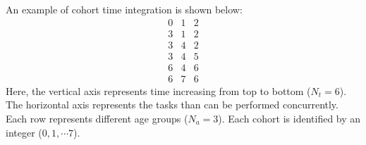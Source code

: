 \documentclass[a4paper,oneside,12pt]{article}
\begin{document}
An example of cohort time integration is shown below:
\begin{equation} \label{eq:cohorts}
\begin{array}{ccc}
0 & 1 & 2 \\
3 & 1 & 2 \\
3 & 4 & 2 \\
3 & 4 & 5 \\
6 & 4 & 6 \\
6 & 7 & 6
\end{array}
\end{equation}
Here, the vertical axis represents time increasing from top to bottom ($N_t = 6$). The horizontal axis represents the 
tasks than can be performed concurrently. Each row represents different age groups ($N_a = 3$). 
Each cohort is identified by an integer ($0, 1, \cdots 7$). 
\end{document}
